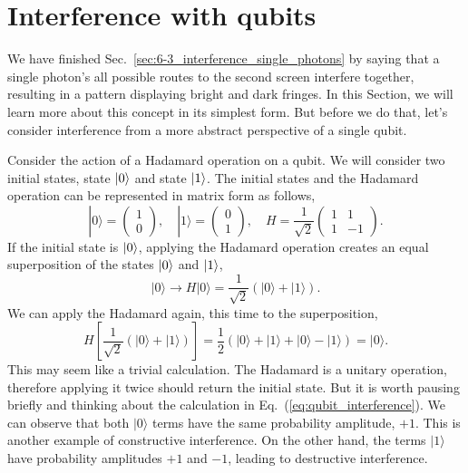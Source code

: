 \section{Interference with qubits}
\label{sec:6-4_interference_single_qubits}

We have finished Sec.~\ref{sec:6-3_interference_single_photons} by saying that a single photon's all possible routes to the second screen interfere together, resulting in a pattern displaying bright and dark fringes.
In this Section, we will learn more about this concept in its simplest form.
But before we do that, let's consider interference from a more abstract perspective of a single qubit.

Consider the action of a Hadamard operation on a qubit.
We will consider two initial states, state $\left| 0 \right\rangle$ and state $\left| 1 \right\rangle$.
The initial states and the Hadamard operation can be represented in matrix form as follows,
\begin{equation}
    |0\rangle = \begin{pmatrix} 1 \\ 0 \end{pmatrix}, \quad
    |1\rangle = \begin{pmatrix} 0 \\ 1 \end{pmatrix}, \quad
    H = \frac{1}{\sqrt{2}} \begin{pmatrix} 1 & 1 \\ 1 & -1 \end{pmatrix}.
\end{equation}
If the initial state is $\left| 0 \right\rangle$, applying the Hadamard operation creates an equal superposition of the states $\left| 0 \right\rangle$ and $\left| 1 \right\rangle$,
\begin{equation}
    |0\rangle \longrightarrow H|0\rangle=\frac{1}{\sqrt{2}}(|0\rangle+|1\rangle).
\end{equation}
We can apply the Hadamard again, this time to the superposition,
\begin{equation}
    H\left[\frac{1}{\sqrt{2}}(|0\rangle+|1\rangle)\right] = \frac{1}{2}(|0\rangle+|1\rangle+|0\rangle-|1\rangle) = |0\rangle.
    \label{eq:qubit_interference}
\end{equation}
This may seem like a trivial calculation.
The Hadamard is a unitary operation, therefore applying it twice should return the initial state.
But it is worth pausing briefly and thinking about the calculation in Eq.~(\ref{eq:qubit_interference}).
We can observe that both $|0\rangle$ terms have the same probability amplitude, $+1$.
This is another example of constructive interference.
On the other hand, the terms $|1\rangle$ have probability amplitudes $+1$ and $-1$, leading to destructive interference.

